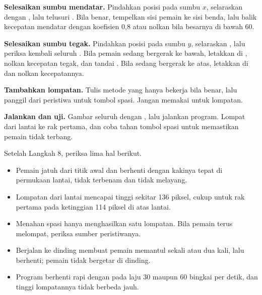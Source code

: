 \begin{langkah}
  \item \textbf{Selesaikan sumbu mendatar.} Pindahkan posisi pada sumbu $x$,
        selaraskan  dengan , lalu telusuri
        . Bila  benar, tempelkan sisi pemain ke
        sisi benda, lalu balik kecepatan mendatar dengan koefisien 0,8 atau
        nolkan bila besarnya di bawah 60.

  \item \textbf{Selesaikan sumbu tegak.} Pindahkan posisi pada sumbu $y$,
        selaraskan , lalu periksa kembali seluruh .
        Bila pemain sedang bergerak ke bawah, letakkan  di
        , nolkan kecepatan tegak, dan tandai
        . Bila sedang bergerak ke atas, letakkan
         di  dan nolkan kecepatannya.

  \item \textbf{Tambahkan lompatan.} Tulis metode  yang hanya
        bekerja bila  benar, lalu panggil dari peristiwa
         untuk tombol spasi. Jangan memakai
         untuk lompatan.

  \item \textbf{Jalankan dan uji.} Gambar seluruh  dengan
        , lalu jalankan program. Lompat dari lantai ke
        rak pertama, dan coba tahan tombol spasi untuk memastikan pemain tidak
        terbang.
\end{langkah}

\begin{ujibox}
Setelah Langkah 8, periksa lima hal berikut.
\begin{itemize}[leftmargin=1.4em, itemsep=0.2em]
  \item Pemain jatuh dari titik awal dan berhenti dengan kakinya tepat di
        permukaan lantai, tidak terbenam dan tidak melayang.
  \item Lompatan dari lantai mencapai tinggi sekitar 136 piksel, cukup untuk
        rak pertama pada ketinggian 114 piksel di atas lantai.
  \item Menahan spasi hanya menghasilkan satu lompatan. Bila pemain terus
        melompat, periksa sumber peristiwanya.
  \item Berjalan ke dinding membuat pemain memantul sekali atau dua kali,
        lalu berhenti; pemain tidak bergetar di dinding.
  \item Program berhenti rapi dengan  pada laju 30 maupun
        60 bingkai per detik, dan tinggi lompatannya tidak berbeda jauh.
\end{itemize}
\end{ujibox}

